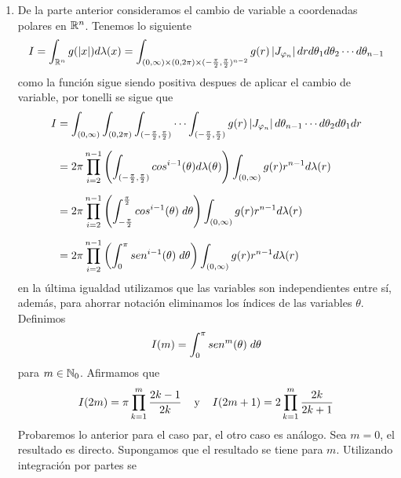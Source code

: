 \documentclass{article}
\begin{document}
\begin{enumerate}
    \item De la parte anterior consideramos el cambio de variable a coordenadas polares en 
    $\mathbb{R}^{n}$. Tenemos lo siguiente
    \begin{equation*}
        I=\int_{\mathbb{R}^{n}}g(\left|x \right|)d\lambda(x)=\int_{(0,\infty)\times(0,2\pi)\times
        (-\frac{\pi}{2},\frac{\pi}{2})^{n-2}}g(r)\left|J_{\varphi_{n}} \right|drd\theta_{1}d\theta_{2}
        \cdots d\theta_{n-1}
    \end{equation*}
    como la función sigue siendo positiva despues de aplicar el cambio de variable, por tonelli 
    se sigue que
    \begin{align*}
        I &= \int_{(0,\infty)}\int_{(0,2\pi)}\int_{(-\frac{\pi}{2},\frac{\pi}{2})}\cdots
        \int_{(-\frac{\pi}{2},\frac{\pi}{2})}g(r)\left|J_{\varphi_{n}} \right|d\theta_{n-1}\cdots 
        d\theta_{2}d\theta_{1}dr \\[2mm]
        &= 2\pi\prod_{i=2}^{n-1}\left(\int_{(-\frac{\pi}{2},\frac{\pi}{2})}cos^{i-1}(\theta)
        d\lambda(\theta)\right)\int_{(0,\infty)}g(r)r^{n-1}d\lambda(r) \\[2mm]
        &= 2\pi\prod_{i=2}^{n-1}\left(\int_{-\frac{\pi}{2}}^{\frac{\pi}{2}}cos^{i-1}(\theta)
        \hspace{1mm}d\theta\right)\int_{(0,\infty)}g(r)r^{n-1}d\lambda(r) \\[2mm]
        &= 2\pi\prod_{i=2}^{n-1}\left(\int_{0}^{\pi}sen^{i-1}(\theta)
        \hspace{1mm}d\theta\right)\int_{(0,\infty)}g(r)r^{n-1}d\lambda(r)
    \end{align*}
    en la última igualdad utilizamos que las variables son independientes entre sí, además, para
    ahorrar notación eliminamos los índices de las variables $\theta$. Definimos
    \begin{equation*}
        I(m)=\int_{0}^{\pi}sen^{m}(\theta)\hspace{1mm}d\theta
    \end{equation*}
    para $m\in\mathbb{N}_{0}$. Afirmamos que
    \begin{equation*}
        I(2m)=\pi\prod_{k=1}^{m}\frac{2k-1}{2k}\hspace{4mm}\text{y}\hspace{4mm}
        I(2m+1)=2\prod_{k=1}^{m}\frac{2k}{2k+1}
    \end{equation*}
    Probaremos lo anterior para el caso par, el otro caso es análogo. Sea $m=0$, el resultado es
    directo. Supongamos que el resultado se tiene para $m$. Utilizando integración por partes se 

\end{enumerate}
\end{document}
